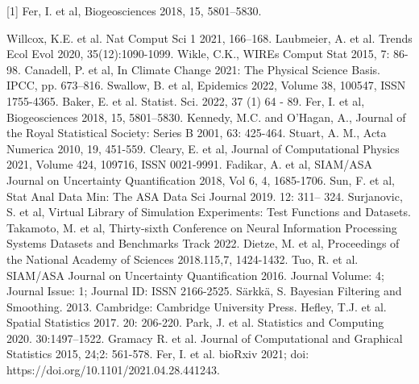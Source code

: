 \documentclass[11pt]{article}
\begin{document}
[1] Fer, I. et al, Biogeosciences 2018, 15, 5801–5830.

\begin{thebibliography}{20}
 Willcox, K.E. et al. Nat Comput Sci 1 2021, 166–168.
 Laubmeier, A. et al. Trends Ecol Evol 2020, 35(12):1090-1099.
 Wikle, C.K.,  WIREs Comput Stat 2015, 7: 86-98.
 Canadell, P. et al, In Climate Change 2021: The Physical Science Basis. IPCC, pp. 673–816.
 Swallow, B. et al, Epidemics 2022, Volume 38, 100547, ISSN 1755-4365.
 Baker, E. et al. Statist. Sci. 2022, 37 (1) 64 - 89.
 Fer, I. et al, Biogeosciences 2018, 15, 5801–5830.
 Kennedy, M.C. and O'Hagan, A., Journal of the Royal Statistical Society: Series B 2001, 63: 425-464.
 Stuart, A. M., Acta Numerica 2010, 19, 451-559. 
 Cleary, E. et al, Journal of Computational Physics 2021, Volume 424, 109716, ISSN 0021-9991.
 Fadikar, A. et al, SIAM/ASA Journal on Uncertainty Quantification 2018, Vol 6, 4, 1685-1706.
 Sun, F. et al, Stat Anal Data Min: The ASA Data Sci Journal 2019. 12: 311– 324. 
 Surjanovic, S. et al, Virtual Library of Simulation Experiments: Test Functions and Datasets.
 Takamoto, M. et al, Thirty-sixth Conference on Neural Information Processing Systems Datasets and Benchmarks Track 2022.
 Dietze, M. et al, Proceedings of the National Academy of Sciences 2018.115,7, 1424-1432.
 Tuo, R. et al. SIAM/ASA Journal on Uncertainty Quantification 2016. Journal Volume: 4; Journal Issue: 1; Journal ID: ISSN 2166-2525.
 Särkkä, S. Bayesian Filtering and Smoothing. 2013. Cambridge: Cambridge University Press.
 Hefley, T.J. et al. Spatial Statistics 2017. 20: 206-220.
 Park, J. et al. Statistics and Computing 2020. 30:1497–1522.
 Gramacy R. et al. Journal of Computational and Graphical Statistics 2015, 24;2: 561-578.
 Fer, I. et al. bioRxiv 2021; doi: https://doi.org/10.1101/2021.04.28.441243. 
\end{thebibliography}
\end{document}
